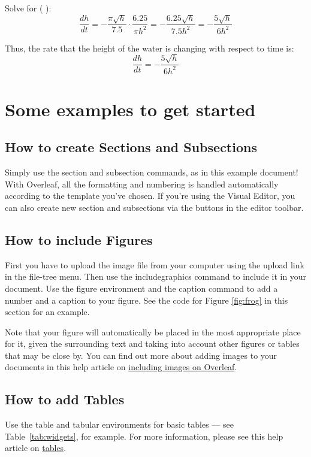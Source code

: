 \documentclass{article}
\begin{document}
Solve for (  ):
$$
\frac{dh}{dt} = -\frac{\pi \sqrt{h}}{7.5} \cdot \frac{6.25}{\pi h^2} = -\frac{6.25 \sqrt{h}}{7.5 h^2} = -\frac{5 \sqrt{h}}{6 h^2}
$$

Thus, the rate that the height of the water is changing with respect to time is:
$$
\frac{dh}{dt} = -\frac{5 \sqrt{h}}{6 h^2}
$$

\section{Some examples to get started}

\subsection{How to create Sections and Subsections}

Simply use the section and subsection commands, as in this example document! With Overleaf, all the formatting and numbering is handled automatically according to the template you've chosen. If you're using the Visual Editor, you can also create new section and subsections via the buttons in the editor toolbar.

\subsection{How to include Figures}

First you have to upload the image file from your computer using the upload link in the file-tree menu. Then use the includegraphics command to include it in your document. Use the figure environment and the caption command to add a number and a caption to your figure. See the code for Figure \ref{fig:frog} in this section for an example.

Note that your figure will automatically be placed in the most appropriate place for it, given the surrounding text and taking into account other figures or tables that may be close by. You can find out more about adding images to your documents in this help article on \href{https://www.overleaf.com/learn/how-to/Including_images_on_Overleaf}{including images on Overleaf}.


\subsection{How to add Tables}

Use the table and tabular environments for basic tables --- see Table~\ref{tab:widgets}, for example. For more information, please see this help article on \href{https://www.overleaf.com/learn/latex/tables}{tables}. 
\end{document}
